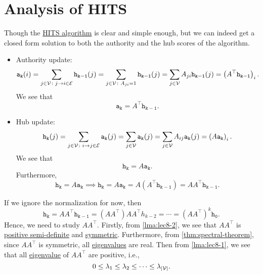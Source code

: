 \section{Analysis of HITS}
Though the \hyperref[algo:HITS-algorithm]{HITS algorithm} is clear and simple enough, but we can indeed get a closed form solution
to both the authority and the hub scores of the algorithm.
\begin{itemize}
	\item Authority update:
	      \[
		      \mathtt{a_k(\mathnormal{i})}  = \sum\limits_{j\in \mathcal{V}\colon j\to i\in \mathcal{E}}\mathtt{h_{k-1}(\mathnormal{j})}
		      =\sum\limits_{j\in\mathcal{V}\colon A_{ji} = 1}\mathtt{h_{k-1}(\mathnormal{j})}
		      =\sum\limits_{j\in\mathcal{V}}A_{ji}\mathtt{h_{k-1}(\mathnormal{j})}
		      = \left(A^{\top} \mathtt{h_{k-1}}\right)_i.
	      \]
	      We see that
	      \[
		      \mathtt{a_k} = A^{\top}\mathtt{h_{k-1}}.
	      \]
	\item Hub update:
	      \[
		      \mathtt{h_k(\mathnormal{j})} = \sum\limits_{j\in\mathcal{V}\colon i\to j\in\mathcal{E}} \mathtt{a_k(\mathnormal{j})}
		      = \sum\limits_{j\in\mathcal{V}} \mathtt{a_k(\mathnormal{j})}
		      = \sum\limits_{j\in\mathcal{V} }A_{ij}\mathtt{a_k(\mathnormal{j})}
		      = \left(A\mathtt{a_k}\right)_i.
	      \]
	      We see that
	      \[
		      \mathtt{h_{k}} = A \mathtt{a_{k}}.
	      \]
	      Furthermore,
	      \[
		      \mathtt{h_k} = A\mathtt{a_k}\implies \mathtt{h_k}= A\mathtt{a_k} = A(A^{\top}\mathtt{h_{k-1}}) = A A^{\top} \mathtt{h_{k-1}}.
	      \]
\end{itemize}
If we ignore the normalization for now, then
\[
	\mathtt{h_k} = A A^{\top}\mathtt{h_{k-1}} = (A A^{\top})A A^{\top} h_{k-2} = \cdots = (A A^{\top})^k \mathtt{h_0}.
\]
Hence, we need to study \(A A^{\top}\). Firstly, from \autoref{lma:lec8-2}, we see that \(A A^{\top} \) is \hyperref[def:positive-semi-definite]{positive semi-definite}
and \hyperref[def:symmetric-matrix]{symmetric}. Furthermore, from \autoref{thm:spectral-theorem}, since \(A A^{\top} \) is symmetric, all \hyperref[def:eigenvalue]{eigenvalues} are real. Then
from \autoref{lma:lec8-1}, we see that all \hyperref[def:eigenvalue]{eigenvalue} of \(A A^{\top} \) are positive, i.e.,
\[
	0 \leq \lambda_1 \leq \lambda_2 \leq \cdots \leq \lambda_{\left\vert \mathcal{\MakeUppercase{v}} \right\vert } .
\]

